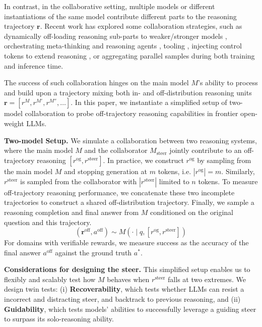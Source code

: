 \documentclass{article} %
\begin{document}
In contrast, in the collaborative setting, multiple models or different instantiations of the same model contribute different parts to the reasoning trajectory $\mathbf{r}$. Recent work has explored some collaboration strategies, such as dynamically off-loading reasoning sub-parts to weaker/stronger models \citep{yan2025learning, zhou2025expo, akhauri2025splitreason, yang2025speculative}, orchestrating meta-thinking and reasoning agents \citep{wan2025rema}, tooling \citep{jin2025search}, injecting control tokens to extend reasoning \citep{muennighoff2025s1}, or aggregating parallel samples \citep{zhao2025majority, qi2025learning} during both training and inference time.


The success of such collaboration hinges on the main model $M$'s ability to process and build upon a trajectory mixing both in- and off-distribution reasoning units $\mathbf{r} = [r^{M}, r^{M'}, r^{M''},\ldots ]$. In this paper, we instantiate a simplified setup of two-model collaboration to probe off-trajectory reasoning capabilities in frontier open-weight LLMs.

\textbf{Two-model Setup.} We simulate a collaboration between two reasoning systems, where the main model $M$ and the collaborator $M_\mathrm{steer}$ jointly contribute to an off-trajectory reasoning $[r^\mathrm{og}, r^\mathrm{steer}]$. In practice, we construct $r^\mathrm{og}$ by sampling from the main model $M$ and stopping generation at $m$ tokens, i.e. $|r^\mathrm{og}| = m$. Similarly, $r^\mathrm{steer}$ is sampled from the collaborator with $|r^\mathrm{steer}| $ limited to $ n$ tokens. To measure off-trajectory reasoning performance, we concatenate these two incomplete trajectories to construct a shared off-distribution trajectory. Finally, we sample a reasoning completion and final answer from $M$ conditioned on the original question and this trajectory.
\begin{equation*}
    (\mathbf{r}^\mathrm{off}, a^\mathrm{off}) \sim M(\cdot \mid q, [r^\mathrm{og}, r^\mathrm{steer}])
\end{equation*} 
For domains with verifiable rewards, we measure success as the accuracy of the final answer $a^\mathrm{off}$ against the ground truth $a^*$.

\textbf{Considerations for designing the steer.} This simplified setup enables us to flexibly and scalably test how $M$ behaves when $r^\mathrm{steer}$ falls at two extremes. We design twin tests: (i) \textbf{Recoverability}, which tests whether LLMs can resist a incorrect and distracting steer, and backtrack to previous reasoning, and (ii) \textbf{Guidability}, which tests models' abilities to successfully leverage a guiding steer to surpass its solo-reasoning ability.
\end{document}
